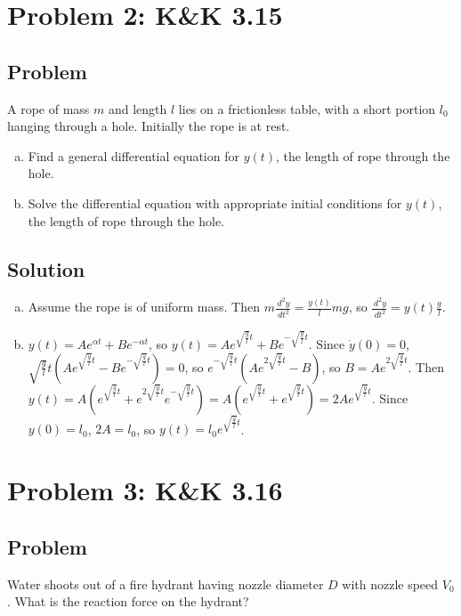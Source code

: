 \documentclass[solutions]{esg8012pset}
\renewcommand{\d}{\,d}
\begin{document}
\section*{Problem 2: K\&K 3.15}
\subsection*{Problem}
  A rope of mass $m$ and length $l$ lies on a frictionless table, with a short portion $l_0$ hanging through a hole. Initially the rope is at rest.
  \begin{enumerate}[(a)]
    \item Find a general differential equation for $y(t)$, the length of rope through the hole.
    \item Solve the differential equation with appropriate initial conditions for $y(t)$, the length of rope through the hole.
  \end{enumerate}
\subsection*{Solution}
  \begin{enumerate}[(a)]
    \item Assume the rope is of uniform mass.  Then $m\frac{\d^2 y}{\d t^2} = \frac{y(t)}{l}m g$, so $\frac{\d^2 y}{\d t^2} = y(t)\frac{g}{l}$.
    \item $y(t) = Ae^{\alpha t} + Be^{-\alpha t}$, so $y(t) = Ae^{\sqrt{\frac{g}{l}}t}+Be^{-\sqrt{\frac{g}{l}}t}$.  Since $\dot y(0) = 0$, $\sqrt{\frac{g}{l}}t\left(Ae^{\sqrt{\frac{g}{l}}t}-Be^{-\sqrt{\frac{g}{l}}t}\right) = 0$, so $e^{-\sqrt{\frac{g}{l}}t}\left(Ae^{2\sqrt{\frac{g}{l}}t} - B\right)$, so $B = Ae^{2\sqrt{\frac{g}{l}}t}$.  Then $y(t) = A\left(e^{\sqrt{\frac{g}{l}}t}+e^{2\sqrt{\frac{g}{l}}t}e^{-\sqrt{\frac{g}{l}}t}\right) = A\left(e^{\sqrt{\frac{g}{l}}t}+e^{\sqrt{\frac{g}{l}}t}\right) = 2Ae^{\sqrt{\frac{g}{l}}t}$.  Since $y(0) = l_0$, $2A = l_0$, so $y(t) = l_0 e^{\sqrt{\frac{g}{l}}t}$.
  \end{enumerate}
\section*{Problem 3: K\&K 3.16}
\subsection*{Problem}
  Water shoots out of a fire hydrant having nozzle diameter $D$ with nozzle speed $V_0$. What is the reaction force on the hydrant?
\end{document}
